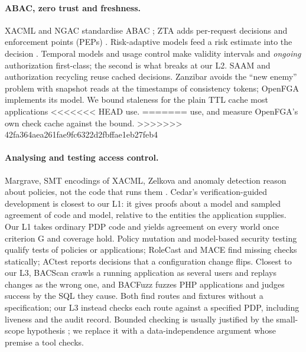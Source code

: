 \documentclass[sigconf,review,anonymous]{acmart}
\begin{document}
\paragraph{ABAC, zero trust and freshness.} XACML and NGAC standardise ABAC
\cite{oasis2013xacml,ferraiolo2016sp800178}; ZTA adds per-request decisions and enforcement points (PEPs)
\cite{rose2020zta}. Risk-adaptive models feed a risk estimate into the decision
\cite{cheng2007fuzzymls,ameer2022bluesky}. Temporal models and usage control \cite{bertino2001trbac,park2004ucon}
make validity intervals and \emph{ongoing} authorization first-class; the second is what breaks at our L2. SAAM
and authorization recycling \cite{crampton2006saam,wei2008recycling} reuse cached decisions. Zanzibar
\cite{pang2019zanzibar} avoids the ``new enemy'' problem with snapshot reads at the timestamps of consistency
tokens; OpenFGA \cite{openfga} implements its model. We bound staleness for the plain TTL cache most applications
<<<<<<< HEAD
use.
=======
use, and measure OpenFGA's own check cache against the bound.
>>>>>>> 42fa364aea261fae9fc6322d2fbffae1eb27feb4

\paragraph{Analysing and testing access control.} Margrave, SMT encodings of XACML, Zelkova and anomaly detection
reason about policies, not the code that runs them
\cite{fisler2005margrave,turkmen2017xacmlsmt,backes2018zelkova,hu2011anomaly}. Cedar's verification-guided
development \cite{cutler2024cedar,disselkoen2024vgd} is closest to our L1: it gives proofs about a model and sampled
agreement of code and model, relative to the entities the application supplies. Our L1 takes ordinary PDP code and
yields agreement on every world once criterion G and coverage hold. Policy mutation \cite{martin2007mutation} and model-based security testing
\cite{mouelhi2008models} qualify tests of policies or applications; RoleCast \cite{son2011rolecast} and MACE
\cite{monshizadeh2014mace} find missing checks statically; ACtest \cite{xiang2025actest} reports decisions that a
configuration change flips. Closest to our L3, BACScan \cite{liu2025bacscan} crawls a running application as
several users and replays changes as the wrong one, and BACFuzz \cite{dharmaadi2025bacfuzz} fuzzes PHP
applications and judges success by the SQL they cause. Both find routes and fixtures without a specification;
our L3 instead checks each route against a specified PDP, including liveness and the audit record. Bounded checking is usually justified by the
small-scope hypothesis \cite{jackson2012alloy}; we replace it with a data-independence argument
\cite{wolper1986,lazic2003semantic} whose premise a tool checks.
\end{document}
